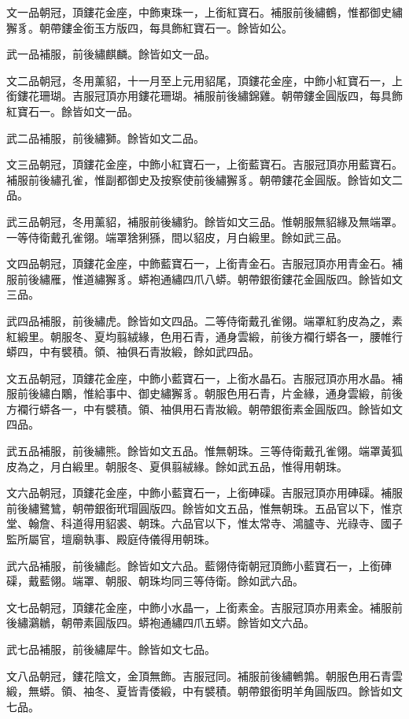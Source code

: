 \begin{pinyinscope}
文一品朝冠，頂鏤花金座，中飾東珠一，上銜紅寶石。補服前後繡鶴，惟都御史繡獬豸。朝帶鏤金銜玉方版四，每具飾紅寶石一。餘皆如公。

武一品補服，前後繡麒麟。餘皆如文一品。

文二品朝冠，冬用薰貂，十一月至上元用貂尾，頂鏤花金座，中飾小紅寶石一，上銜鏤花珊瑚。吉服冠頂亦用鏤花珊瑚。補服前後繡錦雞。朝帶鏤金圓版四，每具飾紅寶石一。餘皆如文一品。

武二品補服，前後繡獅。餘皆如文二品。

文三品朝冠，頂鏤花金座，中飾小紅寶石一，上銜藍寶石。吉服冠頂亦用藍寶石。補服前後繡孔雀，惟副都御史及按察使前後繡獬豸。朝帶鏤花金圓版。餘皆如文二品。

武三品朝冠，冬用薰貂，補服前後繡豹。餘皆如文三品。惟朝服無貂緣及無端罩。一等侍衛戴孔雀翎。端罩猞猁猻，間以貂皮，月白緞里。餘如武三品。

文四品朝冠，頂鏤花金座，中飾藍寶石一，上銜青金石。吉服冠頂亦用青金石。補服前後繡雁，惟道繡獬豸。蟒袍通繡四爪八蟒。朝帶銀銜鏤花金圓版四。餘皆如文三品。

武四品補服，前後繡虎。餘皆如文四品。二等侍衛戴孔雀翎。端罩紅豹皮為之，素紅緞里。朝服冬、夏均翦絨緣，色用石青，通身雲緞，前後方襴行蟒各一，腰帷行蟒四，中有襞積。領、袖俱石青妝緞，餘如武四品。

文五品朝冠，頂鏤花金座，中飾小藍寶石一，上銜水晶石。吉服冠頂亦用水晶。補服前後繡白鷴，惟給事中、御史繡獬豸。朝服色用石青，片金緣，通身雲緞，前後方襴行蟒各一，中有襞積。領、袖俱用石青妝緞。朝帶銀銜素金圓版四。餘皆如文四品。

武五品補服，前後繡熊。餘皆如文五品。惟無朝珠。三等侍衛戴孔雀翎。端罩黃狐皮為之，月白緞里。朝服冬、夏俱翦絨緣。餘如武五品，惟得用朝珠。

文六品朝冠，頂鏤花金座，中飾小藍寶石一，上銜硨磲。吉服冠頂亦用硨磲。補服前後繡鷺鷥，朝帶銀銜玳瑁圓版四。餘皆如文五品，惟無朝珠。五品官以下，惟京堂、翰詹、科道得用貂裘、朝珠。六品官以下，惟太常寺、鴻臚寺、光祿寺、國子監所屬官，壇廟執事、殿庭侍儀得用朝珠。

武六品補服，前後繡彪。餘皆如文六品。藍翎侍衛朝冠頂飾小藍寶石一，上銜硨磲，戴藍翎。端罩、朝服、朝珠均同三等侍衛。餘如武六品。

文七品朝冠，頂鏤花金座，中飾小水晶一，上銜素金。吉服冠頂亦用素金。補服前後繡鸂鶒，朝帶素圓版四。蟒袍通繡四爪五蟒。餘皆如文六品。

武七品補服，前後繡犀牛。餘皆如文七品。

文八品朝冠，鏤花陰文，金頂無飾。吉服冠同。補服前後繡鵪鶉。朝服色用石青雲緞，無蟒。領、袖冬、夏皆青倭緞，中有襞積。朝帶銀銜明羊角圓版四。餘皆如文七品。


\end{pinyinscope}
